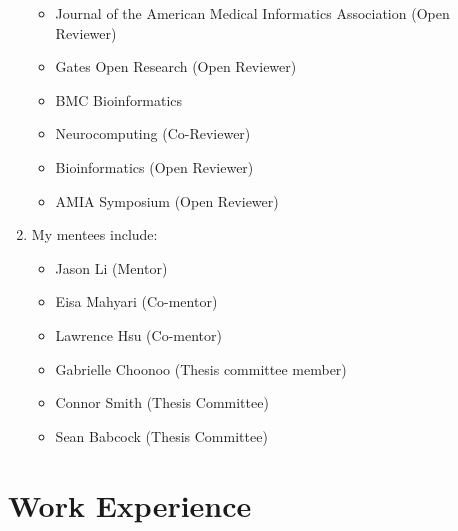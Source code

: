 \documentclass[11pt,]{article}
\providecommand{\tightlist}{%
  \setlength{\itemsep}{0pt}\setlength{\parskip}{0pt}}
\begin{document}
\begin{enumerate}
  \begin{itemize}
  \tightlist
  \item
    Journal of the American Medical Informatics Association (Open
    Reviewer)
  \item
    Gates Open Research (Open Reviewer)
  \item
    BMC Bioinformatics
  \item
    Neurocomputing (Co-Reviewer)
  \item
    Bioinformatics (Open Reviewer)
  \item
    AMIA Symposium (Open Reviewer)
  \end{itemize}
\item
  My mentees include:

  \begin{itemize}
  \tightlist
  \item
    Jason Li (Mentor)
  \item
    Eisa Mahyari (Co-mentor)
  \item
    Lawrence Hsu (Co-mentor)
  \item
    Gabrielle Choonoo (Thesis committee member)
  \item
    Connor Smith (Thesis Committee)
  \item
    Sean Babcock (Thesis Committee)
  \end{itemize}
\end{enumerate}

\section{Work Experience}\label{work-experience}
\end{document}
